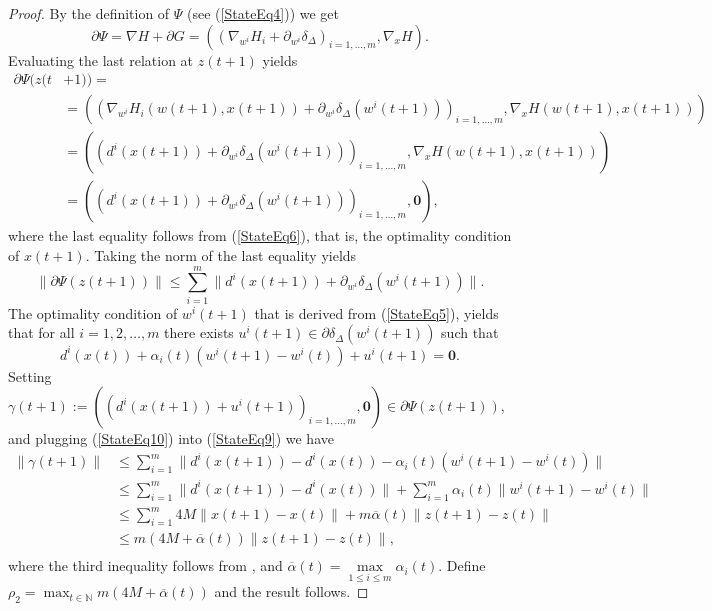 \documentclass[11pt]{article}
\numberwithin{equation}{section}
\begin{document}
\begin{proof}
By the definition of $\Psi$ (see (\ref{StateEq4})) we get
\begin{equation*}
	\partial \Psi = \nabla H + \partial G  
= \left( \left( \nabla_{w^i} H_i + \partial_{w^i} \delta_{\Delta} \right)_{i=1, \ldots ,m} , \nabla_x H \right) .
\end{equation*}
Evaluating the last relation at $z(t+1)$ yields
\begin{equation*}
\begin{aligned}
	\partial \Psi(z(t & + 1)) = \\
	& = \left( \left( \nabla_{w^i} H_i(w(t+1),x(t+1)) + \partial_{w^i} \delta_{\Delta}(w^i(t+1)) \right)_{i=1, \ldots ,m} , \nabla_x H(w(t+1),x(t+1)) \right) \\
	& = \left( \left( d^i(x(t+1)) + \partial_{w^i} \delta_{\Delta}(w^i(t+1)) \right)_{i=1, \ldots ,m} , \nabla_x H(w(t+1),x(t+1)) \right) \\
	& = \left( \left( d^i(x(t+1)) + \partial_{w^i} \delta_{\Delta}(w^i(t+1)) \right)_{i=1, \ldots ,m} , \mathbf{0} \right) ,
\end{aligned}
\end{equation*}
where the last equality follows from (\ref{StateEq6}), that is, the optimality condition of $x(t+1)$. Taking the norm of the last equality yields
\begin{equation}
	\| \partial \Psi(z(t+1))\| 
	\leq \sum\limits_{i=1}^{m} \| d^i(x(t+1)) + \partial_{w^i} \delta_{\Delta}(w^i(t+1)) \|. \label{StateEq9}
\end{equation}
The optimality condition of $w^i(t+1)$ that is derived from (\ref{StateEq5}), yields that for all $i=1, 2, \ldots ,m$ there exists $u^i(t+1) \in \partial \delta_{\Delta}(w^i(t+1))$ such that
\begin{equation}
	d^i(x(t)) + \alpha_i(t) \left( w^i(t+1) - w^i(t) \right) + u^i(t+1) = \mathbf{0} . \label{StateEq10}
\end{equation}
Setting $\gamma(t+1) := \left( \left( d^i(x(t+1)) + u^i(t+1) \right)_{i=1, \ldots ,m}, \mathbf{0} \right) \in \partial \Psi(z(t+1))$, and plugging (\ref{StateEq10}) into (\ref{StateEq9}) we have
\begin{equation*}
\begin{aligned}
	\| \gamma(t+1) \|
	& \leq \sum\limits_{i=1}^{m} \| d^i(x(t+1)) - d^i(x(t)) - \alpha_i(t) \left( w^i(t+1) - w^i(t) \right) \| \\
	& \leq \sum\limits_{i=1}^{m} \| d^i(x(t+1)) - d^i(x(t)) \| + \sum\limits_{i=1}^{m} \alpha_i(t) \| w^i(t+1) - w^i(t) \| \\
	& \leq \sum\limits_{i=1}^{m} 4M \| x(t+1) - x(t) \| + m \overline{\alpha}(t) \|z(t+1) - z(t)\| \\
	& \leq m \left( 4M + \overline{\alpha}(t) \right) \|z(t+1) - z(t)\| , \\
\end{aligned}
\end{equation*}
where the third inequality follows from , and $\overline{\alpha}(t) = \max\limits_{1 \leq i \leq m} \alpha_i(t)$. Define \\$\rho_2 = \max_{t\in \mathbb{N}} m \left( 4M + \overline{\alpha}(t) \right)$ and the result follows.
\end{proof}
\end{document}
